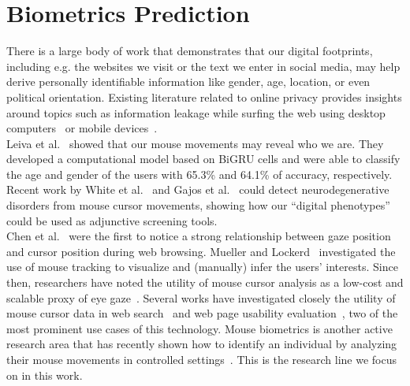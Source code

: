 \documentclass[11pt,oneside,a4paper,openright]{book}
\begin{document}
\section{Biometrics Prediction}


There is a large body of work that demonstrates that our digital footprints,
including e.g. the websites we visit or the text we enter in social media,
may help derive personally identifiable information like gender, age, location, or even political orientation.
Existing literature related to online privacy provides insights around topics such as
information leakage while surfing the web using desktop computers~\cite{Starov_2016}
or mobile devices~\cite{Leung_2016}.\\

Leiva et al.~\cite{Leiva21_privacy} showed that our mouse movements may reveal who we are.
They developed a computational model based on BiGRU cells and were able to classify the age and
gender of the users
with 65.3\% and 64.1\% of accuracy, respectively.
Recent work by White et al.~\cite{White18} and Gajos et al.~\cite{Gajos20}
could detect neurodegenerative disorders from mouse cursor movements,
showing how our ``digital phenotypes'' could be used as adjunctive screening tools.\\

Chen et al.~\cite{Chen_2001} were the first to notice a strong relationship between gaze position and cursor position during web browsing.
Mueller and Lockerd~\cite{Mueller01_cheese} investigated the use of mouse tracking to visualize and (manually) infer the users' interests.
Since then, researchers have noted the utility of mouse cursor analysis
as a low-cost and scalable proxy of eye gaze~\cite{Huang12_search, Huang12_align, Navalpakkam13_layout}.
Several works have investigated closely the utility of mouse cursor data in web search~\cite{Arapakis16_dds, Chen17_satisfaction, Liu15_opinions}
and web page usability evaluation~\cite{Arroyo06_usab, Atterer06_move, Leiva11_adapt},
two of the most prominent use cases of this technology.
Mouse biometrics is another active research area that has recently shown how to identify an individual
by analyzing their mouse movements in controlled settings~\cite{Kratky18_biom, Lu17_biom}.
This is the research line we focus on in this work.\\
\end{document}
